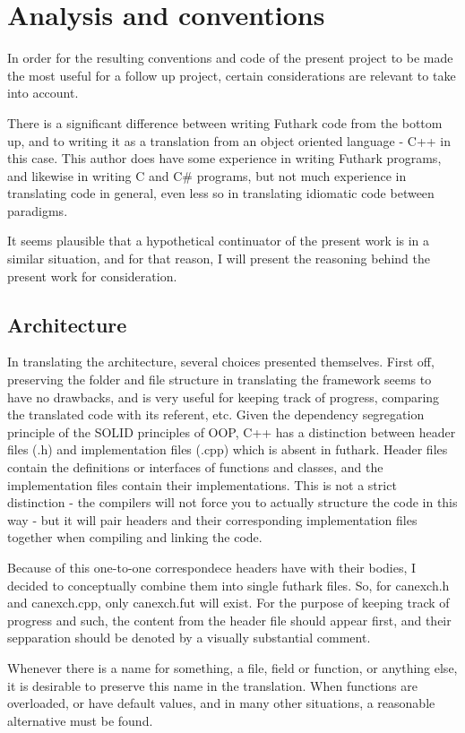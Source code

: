 \section{Analysis and conventions}
In order for the resulting conventions and code of the present project to be made the most useful for a follow up project, certain considerations are relevant to take into account.

There is a significant difference between writing Futhark code from the bottom up, and to writing it as a translation from an object oriented language - C++ in this case. This author does have some experience in writing Futhark programs, and likewise in writing C and C\# programs, but not much experience in translating code in general, even less so in translating idiomatic code between paradigms.

It seems plausible that a hypothetical continuator of the present work is in a similar situation, and for that reason, I will present the reasoning behind the present work for consideration.

\subsection{Architecture}
In translating the architecture, several choices presented themselves. First off, preserving the folder and file structure in translating the framework seems to have no drawbacks, and is very useful for keeping track of progress, comparing the translated code with its referent, etc. Given the dependency segregation principle of the SOLID principles of OOP, C++ has a distinction between header files (.h) and implementation files (.cpp) which is absent in futhark. Header files contain the definitions or interfaces of functions and classes, and the implementation files contain their implementations. This is not a strict distinction - the compilers will not force you to actually structure the code in this way - but it will pair headers and their corresponding implementation files together when compiling and linking the code.

Because of this one-to-one correspondece headers have with their bodies, I decided to conceptually combine them into single futhark files. So, for canexch.h and canexch.cpp, only canexch.fut will exist. For the purpose of keeping track of progress and such, the content from the header file should appear first, and their sepparation should be denoted by a visually substantial comment.

Whenever there is a name for something, a file, field or function, or anything else, it is desirable to preserve this name in the translation. When functions are overloaded, or have default values, and in many other situations, a reasonable alternative must be found.

